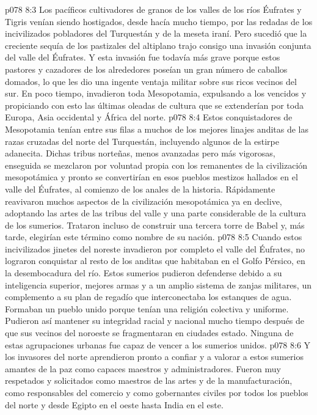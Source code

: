 \vs p078 8:3 \pc Los pacíficos cultivadores de granos de los valles de los ríos Éufrates y Tigris venían siendo hostigados, desde hacía mucho tiempo, por las redadas de los incivilizados pobladores del Turquestán y de la meseta iraní. Pero sucedió que la creciente sequía de los pastizales del altiplano trajo consigo una invasión conjunta del valle del Éufrates. Y esta invasión fue todavía más grave porque estos pastores y cazadores de los alrededores poseían un gran número de caballos domados, lo que les dio una ingente ventaja militar sobre sus ricos vecinos del sur. En poco tiempo, invadieron toda Mesopotamia, expulsando a los vencidos y propiciando con esto las últimas oleadas de cultura que se extenderían por toda Europa, Asia occidental y África del norte.
\vs p078 8:4 Estos conquistadores de Mesopotamia tenían entre sus filas a muchos de los mejores linajes anditas de las razas cruzadas del norte del Turquestán, incluyendo algunos de la estirpe adanecita. Dichas tribus norteñas, menos avanzadas pero más vigorosas, enseguida se mezclaron por voluntad propia con los remanentes de la civilización mesopotámica y pronto se convertirían en esos pueblos mestizos hallados en el valle del Éufrates, al comienzo de los anales de la historia. Rápidamente reavivaron muchos aspectos de la civilización mesopotámica ya en declive, adoptando las artes de las tribus del valle y una parte considerable de la cultura de los sumerios. Trataron incluso de construir una tercera torre de Babel y, más tarde, elegirían este término como nombre de su nación.
\vs p078 8:5 Cuando estos incivilizados jinetes del noreste invadieron por completo el valle del Éufrates, no lograron conquistar al resto de los anditas que habitaban en el Golfo Pérsico, en la desembocadura del río. Estos sumerios pudieron defenderse debido a su inteligencia superior, mejores armas y a un amplio sistema de zanjas militares, un complemento a su plan de regadío que interconectaba los estanques de agua. Formaban un pueblo unido porque tenían una religión colectiva y uniforme. Pudieron así mantener su integridad racial y nacional mucho tiempo después de que sus vecinos del noroeste se fragmentaran en ciudades estado. Ninguna de estas agrupaciones urbanas fue capaz de vencer a los sumerios unidos.
\vs p078 8:6 Y los invasores del norte aprendieron pronto a confiar y a valorar a estos sumerios amantes de la paz como capaces maestros y administradores. Fueron muy respetados y solicitados como maestros de las artes y de la manufacturación, como responsables del comercio y como gobernantes civiles por todos los pueblos del norte y desde Egipto en el oeste hasta India en el este.
